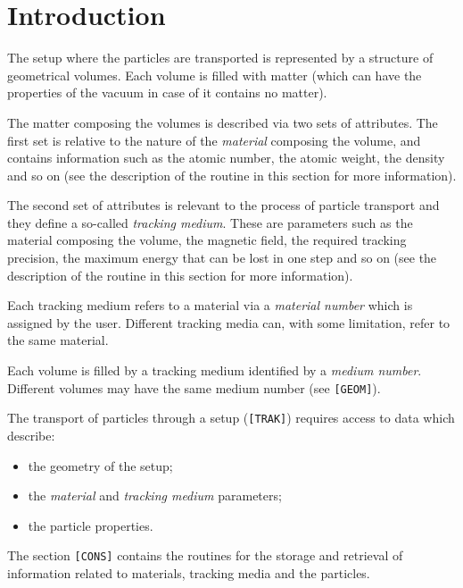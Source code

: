     
\section{Introduction}
 
The setup where the particles are transported is represented by a 
structure of geometrical volumes. Each volume is
filled with matter (which can have the properties of the vacuum in case
of it contains no matter).

The matter composing the volumes is described via
two sets of attributes. The first set is relative to the nature
of the {\it material} composing the volume, and contains information
such as the atomic number, the atomic weight, the density and so on
(see the description of the routine  in this section for
more information). 

The second set of attributes is relevant to the
process of particle transport 
and they define a so-called {\it tracking medium}. These are
parameters such as the material composing the volume,
the magnetic field, the required tracking precision,
the maximum energy that can be lost in one step and so on (see the
description of the routine  in this section for more
information).

Each tracking medium refers to a material via a {\it material
number} which is assigned by the user. Different tracking media can, with
some limitation, refer to the same material.

Each volume is filled by a tracking medium identified by 
a {\it medium number}.
Different volumes may have the same medium number (see {\tt [GEOM]}).
 
The transport of particles through a
setup ({\tt [TRAK]}) requires access to
data which describe:
\begin{itemize}
\item   the geometry of the setup;
\item   the {\it material} and {\it tracking medium} parameters;
\item   the particle properties.
\end{itemize}
The section {\tt [CONS]} contains the routines
for the storage and retrieval of information related to materials,
tracking media and the particles.

